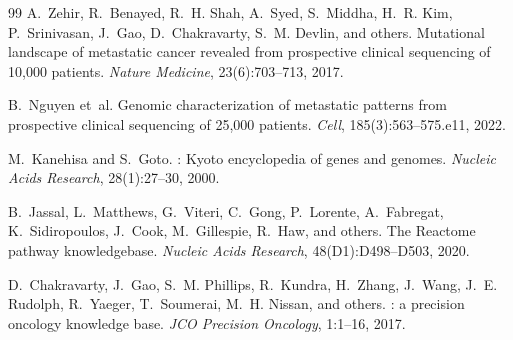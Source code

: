 \documentclass[11pt]{article}
\begin{document}
\begin{thebibliography}{99}
A.~Zehir, R.~Benayed, R.~H. Shah, A.~Syed, S.~Middha, H.~R. Kim,
  P.~Srinivasan, J.~Gao, D.~Chakravarty, S.~M. Devlin, and others.
\newblock Mutational landscape of metastatic cancer revealed from prospective
  clinical sequencing of 10,000 patients.
\newblock \emph{Nature Medicine}, 23(6):703--713, 2017.

B.~Nguyen et~al.
\newblock Genomic characterization of metastatic patterns from prospective
  clinical sequencing of 25,000 patients.
\newblock \emph{Cell}, 185(3):563--575.e11, 2022.

M.~Kanehisa and S.~Goto.
: {K}yoto encyclopedia of genes and genomes.
\newblock \emph{Nucleic Acids Research}, 28(1):27--30, 2000.

B.~Jassal, L.~Matthews, G.~Viteri, C.~Gong, P.~Lorente, A.~Fabregat,
  K.~Sidiropoulos, J.~Cook, M.~Gillespie, R.~Haw, and others.
\newblock The {R}eactome pathway knowledgebase.
\newblock \emph{Nucleic Acids Research}, 48(D1):D498--D503, 2020.

D.~Chakravarty, J.~Gao, S.~M. Phillips, R.~Kundra, H.~Zhang, J.~Wang,
  J.~E. Rudolph, R.~Yaeger, T.~Soumerai, M.~H. Nissan, and others.
: a precision oncology knowledge base.
\newblock \emph{JCO Precision Oncology}, 1:1--16, 2017.

\end{thebibliography}
\end{document}
